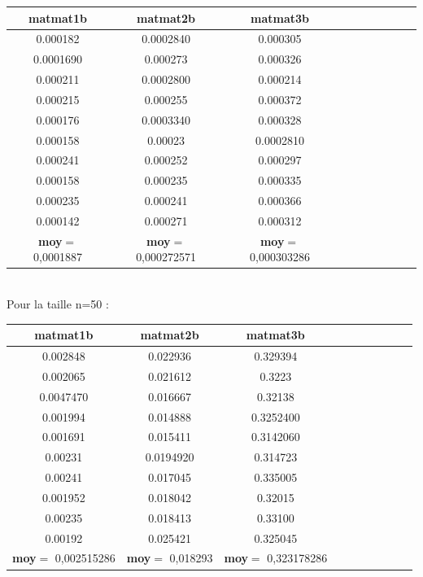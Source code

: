 \documentclass[12pt]{report}
\begin{document}
\begin{tabular}{|*{10}{c|}}
	\hline
	\textbf{matmat1b}  & \textbf{matmat2b}  & \textbf{matmat3b}\\
	\hline
	0.000182  & 0.0002840  & 0.000305   \\
	\hline
	0.0001690  & 0.000273  & 0.000326   \\
	\hline
	0.000211  & 0.0002800  & 0.000214   \\
	\hline
	0.000215  & 0.000255  & 0.000372   \\
	\hline
	0.000176  & 0.0003340  & 0.000328  \\
	\hline
	0.000158  & 0.00023  & 0.0002810   \\
	\hline
	0.000241  & 0.000252  & 0.000297   \\
	\hline
	0.000158  & 0.000235  & 0.000335   \\
	\hline
	0.000235  & 0.000241  & 0.000366   \\
	\hline
	0.000142  & 0.000271  & 0.000312   \\
	\hline
	\textbf{moy}$=$ 0,0001887  & \textbf{moy}$=$ 0,000272571  & \textbf{moy}$=$ 0,000303286   \\
	\hline
\end{tabular}\\[0.5cm]

Pour la taille n=50 :\\[0.5cm]


\begin{tabular}{|*{10}{c|}}
	\hline
	\textbf{matmat1b}  & \textbf{matmat2b}  & \textbf{matmat3b}\\
	\hline
	0.002848  & 0.022936  & 0.329394   \\
	\hline
	0.002065  & 0.021612  & 0.3223   \\
	\hline
	0.0047470  & 0.016667  & 0.32138   \\
	\hline
	0.001994  & 0.014888  & 0.3252400   \\
	\hline
	0.001691  & 0.015411  & 0.3142060  \\
	\hline
	0.00231  & 0.0194920  & 0.314723   \\
	\hline
	0.00241  & 0.017045  & 0.335005   \\
	\hline
	0.001952  & 0.018042  & 0.32015   \\
	\hline
	0.00235  & 0.018413  & 0.33100   \\
	\hline
	0.00192  & 0.025421  & 0.325045   \\
	\hline
	\textbf{moy}$=$ 0,002515286  & \textbf{moy}$=$ 0,018293  & \textbf{moy}$=$ 0,323178286   \\
	\hline
\end{tabular}\\[0.5cm]
\end{document}
